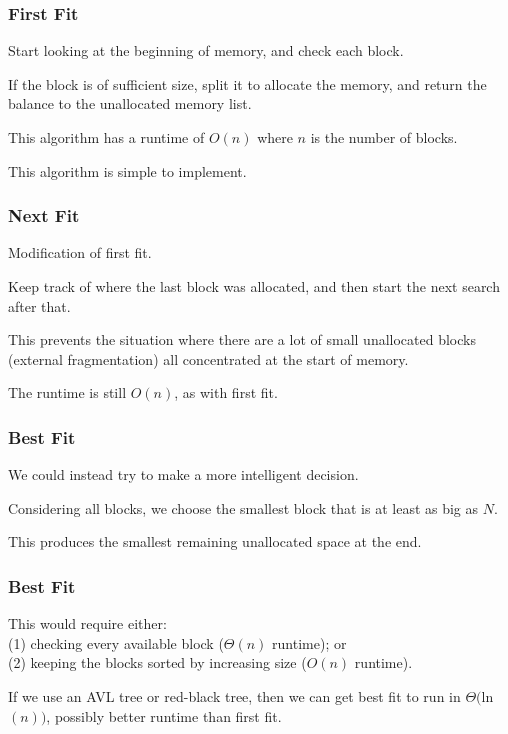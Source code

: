 \begin{frame}
\frametitle{First Fit}

Start looking at the beginning of memory, and check each block. 

If the block is of sufficient size, split it to allocate the memory, and return the balance to the unallocated memory list. 

This algorithm has a runtime of $O(n)$ where $n$ is the number of blocks. 

This algorithm is simple to implement. 



\end{frame}

\begin{frame}
\frametitle{Next Fit}

Modification of first fit.

Keep track of where the last block was allocated, and then start the next search after that. 

This prevents the situation where there are a lot of small unallocated blocks (external fragmentation) all concentrated at the start of memory. 

The runtime is still $O(n)$, as with first fit.

\end{frame}



\begin{frame}
\frametitle{Best Fit}

We could instead try to make a more intelligent decision. 

Considering all blocks, we choose the smallest block that is at least as big as $N$.

This produces the smallest remaining unallocated space at the end. 

\end{frame}

\begin{frame}
\frametitle{Best Fit}

This would require either:\\
\quad (1) checking every available block ($\Theta(n)$ runtime); or\\
\quad (2) keeping the blocks sorted by increasing size ($O(n)$ runtime). 

If we use an AVL tree or red-black tree, then we can get best fit to run in $\Theta($ln$(n))$, possibly better runtime than first fit.

\end{frame}

